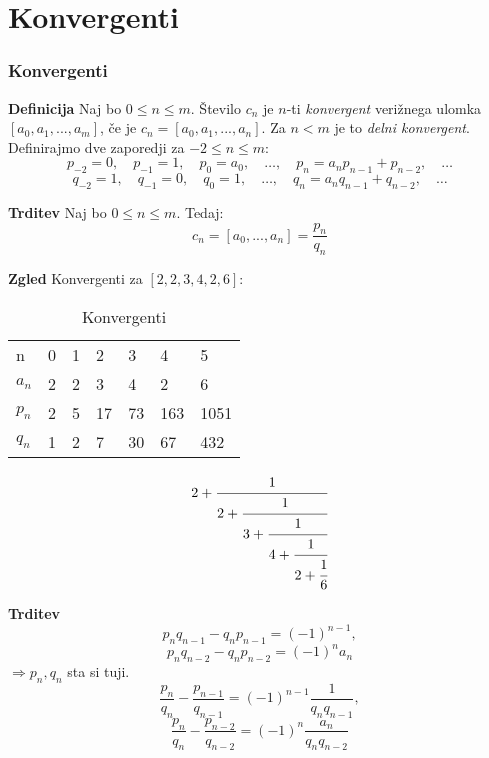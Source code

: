 \documentclass{beamer}
\newenvironment{df}{\begin{block}{\textbf{Definicija}}}{\end{block}}
\newenvironment{zg}{\begin{block}{\textbf{Zgled}}}{\end{block}}
\newenvironment{trd}{\begin{block}{\textbf{Trditev}}}{\end{block}}
\begin{document}
\section{Konvergenti}

\begin{frame}
	\frametitle{Konvergenti}
	\begin{df}
		Naj bo $0 \leq n \leq m$. Število $c_n$ je $n$-ti \textit{konvergent} verižnega ulomka $[a_0, a_1, ..., a_m]$, če je $c_n = [a_0, a_1, ..., a_n]$. Za $n < m$ je to \textit{delni konvergent}.\\
		\vspace{3mm}
		Definirajmo dve zaporedji za $-2\leq n \leq m$:
		\[ p_{-2} = 0, \quad p_{-1} = 1, \quad p_0 = a_0, \quad \dots, \quad p_n = a_{n}p_{n-1} + p_{n-2}, \quad \dots \]
		\[ q_{-2} = 1,\quad q_{-1} = 0,\quad q_0 = 1,\quad \dots,\quad q_n = a_{n}q_{n-1} + q_{n-2},\quad \dots \]
	\end{df}
\pause
	\begin{trd}
	Naj bo $0\leq n \leq m$. Tedaj: \[c_n = [a_0, ..., a_n] = \frac{p_n}{q_n} \]
	\end{trd}
\end{frame}

\begin{frame}
	\begin{zg}
	Konvergenti za $[2, 2, 3, 4, 2, 6]$:
	\begin{table}[]
	\centering
	\caption{Konvergenti}
	\label{Tabela 1}
	\begin{tabular}{l|llllll}
	n    & 0   & 1   & 2    & 3     & 4      & 5        \\
	$a_n$ & 2   & 2   & 3    & 4     & 2      & 6        \\
	$p_n$ & 2   & 5   & 17   & 73    & 163    & 1051     \\
	$q_n$ & 1   & 2   & 7    & 30    & 67     & 432
		\end{tabular}
		\end{table}
		\[ 2 + \cfrac{1}{2 + \cfrac{1}{3+\cfrac{1}{4+\cfrac{1}{2+\cfrac{1}{6}}}}} \]
	\end{zg}
\end{frame}

\begin{frame}
	\begin{trd}
	\[ p_n q_{n-1} - q_n p_{n-1} = (-1)^{n-1}, \] 
	\[ p_n q_{n-2} - q_n p_{n-2} = (-1)^n a_n \] \pause \hspace{4cm}$\Rightarrow p_n, q_n$ sta si tuji. \vspace{5mm} \pause
	\[ \frac{p_n}{q_n} - \frac{p_{n-1}}{q_{n-1}} = (-1)^{n-1}\frac{1}{q_n q_{n-1}}, \]
	\[ \frac{p_n}{q_n} - \frac{p_{n-2}}{q_{n-2}} = (-1)^{n}\frac{a_n}{q_n q_{n-2}} \]
	\end{trd}
\end{frame}
\end{document}
